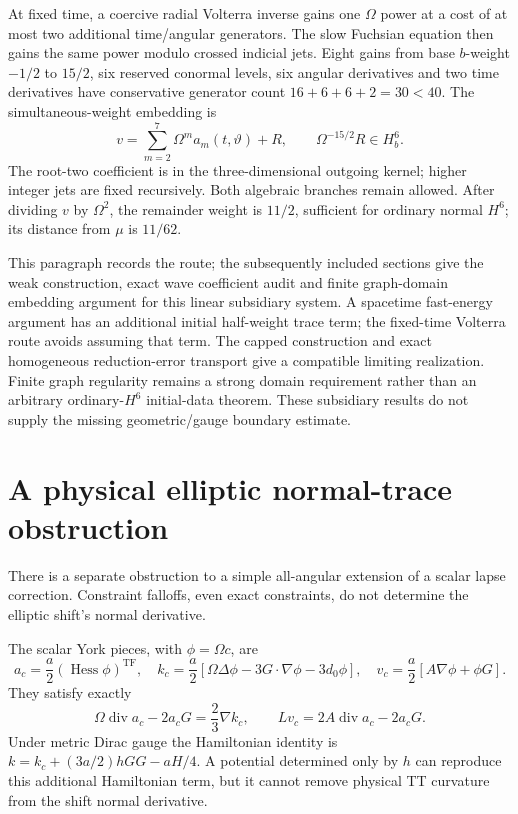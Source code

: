 \documentclass[11pt]{article}
\newcommand{\TF}{\mathrm{TF}}
\begin{document}
At fixed time, a coercive radial Volterra inverse gains one
$\Omega$ power at a cost of at most two additional time/angular
generators. The slow Fuchsian equation then gains the same power
modulo crossed indicial jets. Eight gains from base $b$-weight
$-1/2$ to $15/2$, six reserved conormal levels, six angular derivatives
and two time derivatives have conservative generator count
$16+6+6+2=30<40$. The simultaneous-weight embedding is
\[
v=\sum_{m=2}^7\Omega^m a_m(t,\vartheta)+R,\qquad
\Omega^{-15/2}R\in H_b^6.
\]
The root-two coefficient is in the three-dimensional outgoing kernel;
higher integer jets are fixed recursively. Both algebraic branches
remain allowed. After dividing $v$ by $\Omega^2$, the remainder
weight is $11/2$, sufficient for ordinary normal $H^6$; its distance
from $\mu$ is $11/62$.

This paragraph records the route; the subsequently included sections
give the weak construction, exact wave coefficient audit and finite
graph-domain embedding argument for this linear subsidiary system.
A spacetime fast-energy argument has an additional initial half-weight
trace term; the fixed-time Volterra route avoids assuming that term.
The capped construction and exact homogeneous reduction-error transport
give a compatible limiting realization. Finite graph regularity remains
a strong domain requirement rather than an arbitrary ordinary-$H^6$
initial-data theorem. These subsidiary results do not supply the missing
geometric/gauge boundary estimate.

\section{A physical elliptic normal-trace obstruction}
There is a separate obstruction to a simple all-angular extension of
a scalar lapse correction. Constraint falloffs, even exact constraints,
do not determine the elliptic shift's normal derivative.

The scalar York pieces, with $\phi=\Omega c$, are
\[
a_c=\frac a2(\operatorname{Hess}\phi)^\TF,\quad
k_c=\frac a2[\Omega\Delta\phi-3G\cdot\nabla\phi-3d_0\phi],
\quad
v_c=\frac a2[A\nabla\phi+\phi G].
\]
They satisfy exactly
\[
\Omega\operatorname{div}a_c-2a_cG=\frac23\nabla k_c,\qquad
Lv_c=2A\operatorname{div}a_c-2a_cG .
\]
Under metric Dirac gauge the Hamiltonian identity is
$k=k_c+(3a/2)hGG-aH/4$.
A potential determined only by $h$ can reproduce this additional
Hamiltonian term, but it cannot remove physical TT curvature from
the shift normal derivative.
\end{document}
